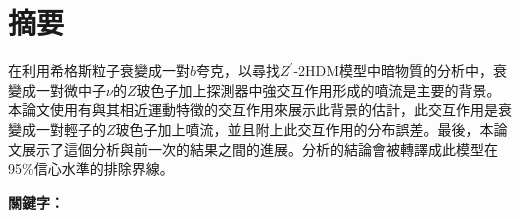 \documentclass[class=NTHU_thesis, crop=false]{standalone}
\begin{document}
\setlength{\parindent}{2em} %

\chapter{摘要}
在利用希格斯粒子衰變成一對$b$夸克，以尋找$Z^\prime$-2HDM模型中暗物質的分析中，衰變成一對微中子$\nu$的$Z$玻色子加上探測器中強交互作用形成的噴流是主要的背景。本論文使用有與其相近運動特徵的交互作用來展示此背景的估計，此交互作用是衰變成一對輕子的$Z$玻色子加上噴流，並且附上此交互作用的分布誤差。最後，本論文展示了這個分析與前一次的結果之間的進展。分析的結論會被轉譯成此模型在95\%信心水準的排除界線。

\vspace{2em}
\noindent \textbf{關鍵字：} \keywordsZh{} %
\end{document}
